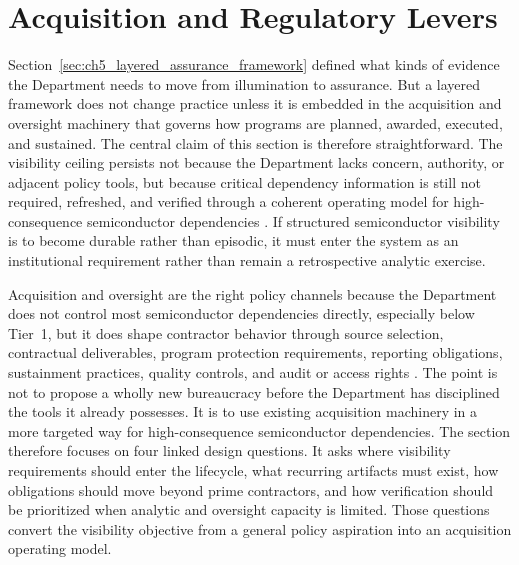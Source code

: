 \section{Acquisition and Regulatory Levers}
\label{sec:ch5_acquisition_regulatory_levers}

Section~\ref{sec:ch5_layered_assurance_framework} defined what kinds of evidence the Department needs to move from illumination to assurance. But a layered framework does not change practice unless it is embedded in the acquisition and oversight machinery that governs how programs are planned, awarded, executed, and sustained. The central claim of this section is therefore straightforward. The visibility ceiling persists not because the Department lacks concern, authority, or adjacent policy tools, but because critical dependency information is still not required, refreshed, and verified through a coherent operating model for high-consequence semiconductor dependencies \parencite{ch5_dod2022_supplychains,ch5_dodi500085,ch5_dodi520044,ch5_dodi424515,U.S.GovernmentAccountabilityOffice2025}. If structured semiconductor visibility is to become durable rather than episodic, it must enter the system as an institutional requirement rather than remain a retrospective analytic exercise.

Acquisition and oversight are the right policy channels because the Department does not control most semiconductor dependencies directly, especially below Tier~1, but it does shape contractor behavior through source selection, contractual deliverables, program protection requirements, reporting obligations, sustainment practices, quality controls, and audit or access rights \parencite{ch5_dodi500085,ch5_dfars2522467007}. The point is not to propose a wholly new bureaucracy before the Department has disciplined the tools it already possesses. It is to use existing acquisition machinery in a more targeted way for high-consequence semiconductor dependencies. The section therefore focuses on four linked design questions. It asks where visibility requirements should enter the lifecycle, what recurring artifacts must exist, how obligations should move beyond prime contractors, and how verification should be prioritized when analytic and oversight capacity is limited. Those questions convert the visibility objective from a general policy aspiration into an acquisition operating model.

